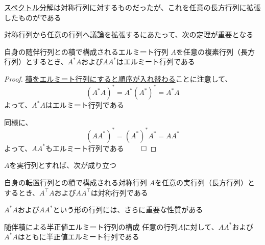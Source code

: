 \documentclass[../../../topic_linear-algebra]{subfiles}
\begin{document}
\hyperref[thm:spectral-decomposition-symmetric]{スペクトル分解}は対称行列に対するものだったが、これを任意の長方行列に拡張したものがである

\br

対称行列から任意の行列へ議論を拡張するにあたって、次の定理が重要となる

\begin{theorem}{自身の随伴行列との積で構成されるエルミート行列}
  $A$を任意の複素行列（長方行列）とするとき、$A^* A$および$AA^*$はエルミート行列である
\end{theorem}

\begin{proof}
  \hyperref[thm:adjoint-of-product]{積をエルミート行列にすると順序が入れ替わる}ことに注意して、
  \begin{equation*}
    (A^* A)^* = A^* (A^*)^* = A^* A
  \end{equation*}
  よって、$A^* A$はエルミート行列である

  \br

  同様に、
  \begin{equation*}
    (AA^*)^* = (A^*)^* A^* = AA^*
  \end{equation*}
  よって、$AA^*$もエルミート行列である $\qed$
\end{proof}

\br

$A$を実行列とすれば、次が成り立つ

\begin{theorem}{自身の転置行列との積で構成される対称行列}\label{thm:symmetric-products-of-any-matrix}
  $A$を任意の実行列（長方行列）とするとき、$A^\top A$および$AA^\top$は対称行列である
\end{theorem}

\sectionline

$A^* A$および$AA^*$という形の行列には、さらに重要な性質がある

\begin{theorem}{随伴積による半正値エルミート行列の構成}
  任意の行列$A$に対して、$AA^*$および$A^*A$はともに半正値エルミート行列である
\end{theorem}
\end{document}
